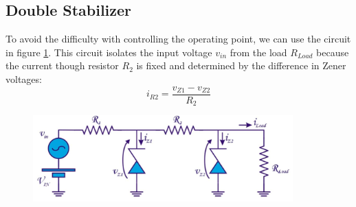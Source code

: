 \subsection{Double Stabilizer}

To avoid the difficulty with controlling the operating point, we can use the circuit in figure \ref{fig:stabilizer4}. This circuit isolates the input voltage $v_{in}$ from the load $R_{Load}$ because the current though resistor $R_2$ is fixed and determined by the difference in Zener voltages:
$$
i_{R2} = \frac{v_{Z1} - v_{Z2}}{R_2}
$$

\begin{figure}[h!]
	\centering
	\includegraphics[width=10cm]{figures/ch12/stabilizer4.jpg}
	\caption{}
	\label{fig:stabilizer4}
\end{figure}

